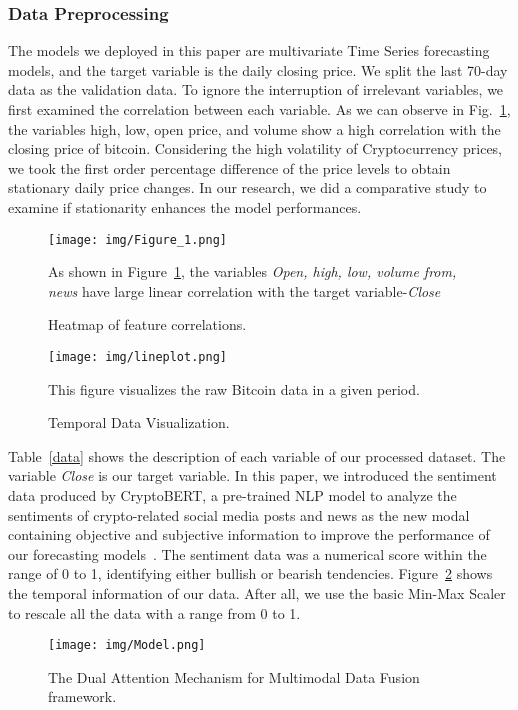 \subsubsection{Data Preprocessing}
The models we deployed in this paper are multivariate Time Series forecasting models, and the target variable is the daily closing price. We split the last 70-day data as the validation data. To ignore the interruption of irrelevant variables, we first examined the correlation between each variable. As we can observe in Fig.~\ref{corr}, the variables high, low, open price, and volume show a high correlation with the closing price of bitcoin. Considering the high volatility of Cryptocurrency prices, we took the first order percentage difference of the price levels to obtain stationary daily price changes. In our research, we did a comparative study to examine if stationarity enhances the model performances. 
\begin{figure}[htbp]
\centerline{\texttt{[image: img/Figure\_1.png]}}
\par As shown in Figure~\ref{corr}, the variables \textit{Open, high, low, volume from, news} have large linear correlation with the target variable-\textit{Close}
\caption{Heatmap of feature correlations.}

\label{corr}
\end{figure}


\begin{figure}[htbp]
\centerline{\texttt{[image: img/lineplot.png]}}
\caption{Temporal Data Visualization.}
\label{lineplot}
\par This figure visualizes the raw Bitcoin data in a given period.
\end{figure}

Table~\ref{data} shows the description of each variable of our processed dataset. The variable \textit{Close} is our target variable. In this paper, we introduced the sentiment data produced by CryptoBERT, a pre-trained NLP model to analyze the sentiments of crypto-related social media posts and news as the new modal containing objective and subjective information to improve the performance of our forecasting models~\cite{cryptobert}. The sentiment data was a numerical score within the range of 0 to 1, identifying either bullish or bearish tendencies. Figure~\ref{lineplot} shows the temporal information of our data. After all, we use the basic Min-Max Scaler to rescale all the data with a range from 0 to 1.

\begin{figure*}[t]
\centerline{\texttt{[image: img/Model.png]}}
\caption{The Dual Attention Mechanism for Multimodal Data Fusion framework.}
\label{model}
\end{figure*}

